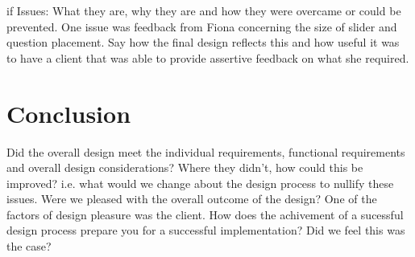 \documentclass{l3proj}
\begin{document}
if Issues: What they are, why they are and how they were overcame or could be prevented.
One issue was feedback from Fiona concerning the size of slider and question placement. Say how the final design reflects this and how useful it was to have a client that was able to provide assertive feedback on what she required. 

\section{Conclusion}

Did the overall design meet the individual requirements, functional requirements and overall design considerations?
Where they didn't, how could this be improved? i.e. what would we change about the design process to nullify these issues.
Were we pleased with the overall outcome of the design?
One of the factors of design pleasure was the client.
How does the achivement of a sucessful design process prepare you for a successful implementation?
Did we feel this was the case?
\end{document}
